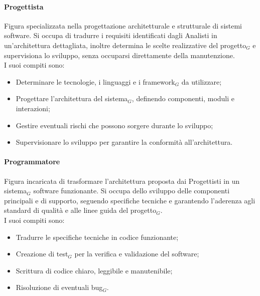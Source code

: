 \documentclass[10pt]{article}
\begin{document}
\begin{justify}
        \paragraph{Progettista}
        Figura specializzata nella progettazione architetturale e strutturale di sistemi software. Si occupa di tradurre i requisiti identificati dagli Analisti in un'architettura dettagliata, inoltre determina le scelte realizzative del progetto$_G$ e supervisiona lo sviluppo, senza occuparsi direttamente della manutenzione.\\
        I suoi compiti sono:
        \begin{itemize}
            \item Determinare le tecnologie, i linguaggi e i framework$_G$ da utilizzare;
            \item Progettare l'architettura del sistema$_G$, definendo componenti, moduli e interazioni;
            \item Gestire eventuali rischi che possono sorgere durante lo sviluppo;
            \item Supervisionare lo sviluppo per garantire la conformità all'architettura.
        \end{itemize}

        \paragraph{Programmatore}
        Figura incaricata di trasformare l'architettura proposta dai Progettisti in un sistema$_G$ software funzionante. Si occupa dello sviluppo delle componenti principali e di supporto, seguendo specifiche tecniche e garantendo l'aderenza agli standard di qualità e alle linee guida del progetto$_G$.\\
        I suoi compiti sono:
        \begin{itemize}
            \item Tradurre le specifiche tecniche in codice funzionante;
            \item Creazione di test$_G$ per la verifica e validazione del software;
            \item Scrittura di codice chiaro, leggibile e manutenibile;
            \item Risoluzione di eventuali bug$_G$.
        \end{itemize}


\end{justify}
\end{document}
